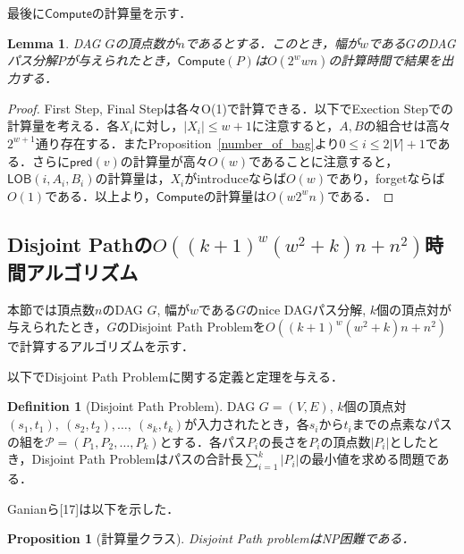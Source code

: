 \documentclass[master]{kuisthesis}		%
\theoremstyle{plain}
\newtheorem{proposition}{Proposition}
\newtheorem{lemma}{Lemma}
\theoremstyle{definition}
\newtheorem{definition*}{Definition}
\begin{document}
最後に$\mathsf{Compute}$の計算量を示す．

\begin{lemma}
    DAG $G$の頂点数が$n$であるとする．このとき，幅が$w$である$G$のDAGパス分解$P$が与えられたとき，$\mathsf{Compute}(P)$は$O(2^wwn)$の計算時間で結果を出力する．
\end{lemma}

\begin{proof}
    First Step, Final Stepは各々O(1)で計算できる．以下でExection Stepでの計算量を考える．各$X_i$に対し，$|X_i| \leq w+1$に注意すると，$A, B$の組合せは高々$2^{w+1}$通り存在する．またProposition~\ref{number_of_bag}より$0 \leq i \leq 2|V|+1$である．さらに$\mathsf{pred}(v)$の計算量が高々$O(w)$であることに注意すると，$\mathsf{LOB}(i, A_i, B_i)$の計算量は，$X_i$がintroduceならば$O(w)$であり，forgetならば$O(1)$である．以上より，$\mathsf{Compute}$の計算量は$O(w2^wn)$である．
\end{proof}














\subsection{Disjoint Pathの$O((k+1)^w(w^2+k)n+n^2)$時間アルゴリズム}

本節では頂点数$n$のDAG $G$, 幅が$w$である$G$のnice DAGパス分解, $k$個の頂点対が与えられたとき，$G$のDisjoint Path Problemを$O((k+1)^w(w^2+k)n+n^2)$で計算するアルゴリズムを示す．


以下でDisjoint Path Problemに関する定義と定理を与える．

\begin{definition*}[Disjoint Path Problem]
    DAG $G=(V, E)$, $k$個の頂点対$(s_1, t_1),\ (s_2, t_2), \dots ,\ (s_k, t_k)$が入力されたとき，各$s_i$から$t_i$までの点素なパスの組を$\mathcal{P}=(P_1, P_2, \dots , P_k)$とする．各パス$P_i$の長さを$P_i$の頂点数$|P_i|$としたとき，Disjoint Path Problemはパスの合計長$\sum_{i=1}^k |P_i|$の最小値を求める問題である．
\end{definition*}

Ganianら[17]は以下を示した．

\begin{proposition}[計算量クラス]
    Disjoint Path problemはNP困難である．
\end{proposition}
\end{document}
